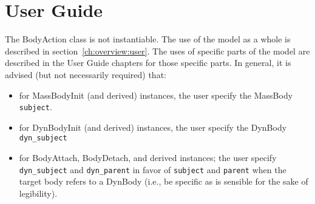 %

\chapter{User Guide}\label{ch:\modelpartid:user}
The BodyAction class is not instantiable.
The use of the model as a whole is described in section~\ref{ch:overview:user}.
The uses of specific parts of the model are described in the User Guide
chapters for those specific parts. In general, it is advised (but not necessarily required) that:

\begin{itemize}
\item for MassBodyInit (and derived) instances, the user specify the MassBody {\tt subject}.
\item for DynBodyInit (and derived) instances, the user specify the DynBody {\tt dyn\_subject}
\item for BodyAttach, BodyDetach, and derived instances; the user specify {\tt dyn\_subject} and {\tt dyn\_parent} in favor of {\tt subject} and {\tt parent} when the target body refers to a DynBody (i.e., be specific as is sensible for the sake of legibility).
\end{itemize}
